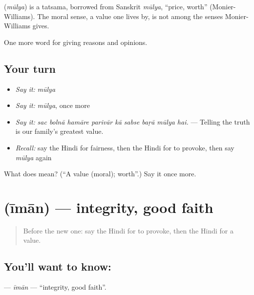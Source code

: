 \begin{cousinweb}
\textbf{} (\emph{mūlya}) is a tatsama, borrowed from Sanskrit \emph{mūlya}, \textquotedblleft{}price, worth\textquotedblright{} (Monier-Williams). The moral sense, a value one lives by, is not among the senses Monier-Williams gives.
\end{cousinweb}

\begin{grammarlens}[title={What you've built}]
One more word for giving reasons and opinions.
\end{grammarlens}

\subsection*{Your turn}
\begin{itemize}
\raggedright
  \item \emph{Say it:} \emph{mūlya}
  \item \emph{Say it:} \emph{mūlya}, once more
  \item \emph{Say it:} \emph{sac bolnā hamāre parivār kā sabse baṛā mūlya hai.} — Telling the truth is our family's greatest value.
  \item \emph{Recall:} say the Hindi for fairness, then the Hindi for to provoke, then say \emph{mūlya} again
\end{itemize}

\begin{tcolorbox}[breakable,colback=teal!4,colframe=teal!35!black,title={Before you move on}]
What does  mean? (\textquotedblleft{}A value (moral); worth\textquotedblright{}.) Say it once more.
\end{tcolorbox}
\section[\texorpdfstring{\hi{ईमान} (īmān)}{ईमान (īmān)}]{ (īmān) — integrity, good faith}

\label{lesson:HI-C357-iman}



\begin{quote}
Before the new one: say the Hindi for to provoke, then the Hindi for a value.
\end{quote}

\subsection*{You'll want to know: }
\textbf{} — \emph{īmān} — \textquotedblleft{}integrity, good faith\textquotedblright{}.


